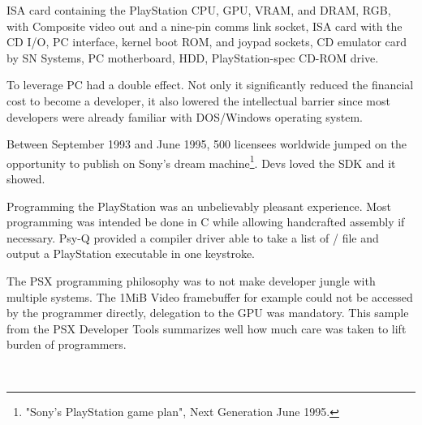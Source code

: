 \par
{} ISA card containing the PlayStation CPU, GPU, VRAM, and DRAM, RGB, with Composite video out and a nine-pin comms link socket,  ISA card with the CD I/O, PC interface, kernel boot ROM, and joypad sockets,  CD emulator card by SN Systems,  PC motherboard,  HDD,  PlayStation-spec CD-ROM drive. \\
\par
To leverage PC had a double effect. Not only it significantly reduced the financial cost to become a developer, it also lowered the intellectual barrier since most developers were already familiar with DOS/Windows operating system.\\
\par Between September 1993 and June 1995, 500 licensees worldwide jumped on the opportunity to publish on Sony's dream machine\footnote{"Sony's PlayStation game plan", Next Generation June 1995.}. Devs loved the SDK and it showed.







Programming the PlayStation was an unbelievably pleasant experience. Most programming was intended be done in C while allowing handcrafted assembly if necessary. Psy-Q provided a compiler driver able to take a list of / file and output a PlayStation executable in one keystroke.\\
\par
The PSX programming philosophy was to not make developer jungle with multiple systems. The 1MiB Video framebuffer for example could not be accessed by the programmer directly, delegation to the GPU was mandatory. This sample from the PSX Developer Tools summarizes well how much care was taken to lift burden of programmers.\\
\par
{}\\
\par
{}
\par









